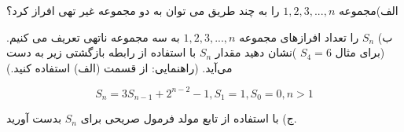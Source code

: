 \EXERCISE
الف)مجموعه
${1, 2, 3, ..., n}$
را به چند طریق می توان به دو مجموعه غیر تهی افراز کرد؟

ب)
$S_n$
را تعداد افرازهای مجموعه
${1, 2, 3, ..., n}$
به سه مجموعه ناتهی تعریف می کنیم.(برای مثال
$S_4 = 6$
)نشان دهید مقدار
$S_n$
با استفاده از رابطه بازگشتی زیر به دست می‌آید.
(راهنمایی: از قسمت (الف) استفاده کنید.)

$$S_n = 3S_{n-1} + 2^{n-2} - 1, S_1 = 1, S_0 = 0, n > 1$$

ج) با استفاده از تابع مولد فرمول صریحی برای
$S_n$
بدست آورید.